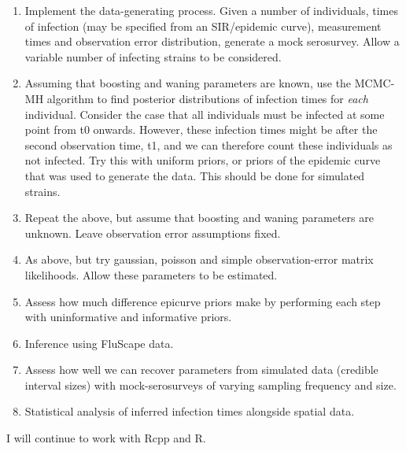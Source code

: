 \documentclass[a4paper,11pt,twoside]{article}
\begin{document}
\begin{enumerate}
\item Implement the data-generating process. Given a number of individuals, times of infection (may be specified from an SIR/epidemic curve), measurement times and observation error distribution, generate a mock serosurvey. Allow a variable number of infecting strains to be considered.
\item Assuming that boosting and waning parameters are known, use the MCMC-MH algorithm to find posterior distributions of infection times for \emph{each} individual. Consider the case that all individuals must be infected at some point from t0 onwards. However, these infection times might be after the second observation time, t1, and we can therefore count these individuals as not infected. Try this with uniform priors, or priors of the epidemic curve that was used to generate the data. This should be done for simulated strains.
\item Repeat the above, but assume that boosting and waning parameters are unknown. Leave observation error assumptions fixed.
\item As above, but try gaussian, poisson and simple observation-error matrix likelihoods. Allow these parameters to be estimated.
\item Assess how much difference epicurve priors make by performing each step with uninformative and informative priors.
\item Inference using FluScape data.
\item Assess how well we can recover parameters from simulated data (credible interval sizes) with mock-serosurveys of varying sampling frequency and size.
\item Statistical analysis of inferred infection times alongside spatial data.
\end{enumerate}

I will continue to work with Rcpp and R.
\end{document}
